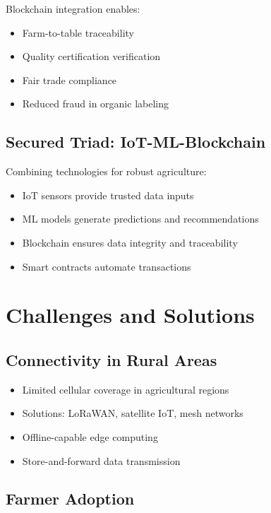 \documentclass[12pt,a4paper]{article}
\begin{document}
Blockchain integration enables:
\begin{itemize}
    \item Farm-to-table traceability
    \item Quality certification verification
    \item Fair trade compliance
    \item Reduced fraud in organic labeling
\end{itemize}

\subsection{Secured Triad: IoT-ML-Blockchain}

Combining technologies for robust agriculture:
\begin{itemize}
    \item IoT sensors provide trusted data inputs
    \item ML models generate predictions and recommendations
    \item Blockchain ensures data integrity and traceability
    \item Smart contracts automate transactions
\end{itemize}

\section{Challenges and Solutions}

\subsection{Connectivity in Rural Areas}

\begin{itemize}
    \item Limited cellular coverage in agricultural regions
    \item Solutions: LoRaWAN, satellite IoT, mesh networks
    \item Offline-capable edge computing
    \item Store-and-forward data transmission
\end{itemize}

\subsection{Farmer Adoption}
\end{document}

